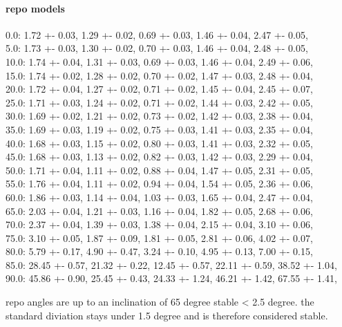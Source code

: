 \paragraph{repo models}
% 
0.0:     1.72 +- 0.03, 1.29 +- 0.02, 0.69 +- 0.03, 1.46 +- 0.04, 2.47 +- 0.05,\\
5.0:     1.73 +- 0.03, 1.30 +- 0.02, 0.70 +- 0.03, 1.46 +- 0.04, 2.48 +- 0.05,\\
10.0:    1.74 +- 0.04, 1.31 +- 0.03, 0.69 +- 0.03, 1.46 +- 0.04, 2.49 +- 0.06,\\
15.0:    1.74 +- 0.02, 1.28 +- 0.02, 0.70 +- 0.02, 1.47 +- 0.03, 2.48 +- 0.04,\\
20.0:    1.72 +- 0.04, 1.27 +- 0.02, 0.71 +- 0.02, 1.45 +- 0.04, 2.45 +- 0.07,\\
25.0:    1.71 +- 0.03, 1.24 +- 0.02, 0.71 +- 0.02, 1.44 +- 0.03, 2.42 +- 0.05,\\
30.0:    1.69 +- 0.02, 1.21 +- 0.02, 0.73 +- 0.02, 1.42 +- 0.03, 2.38 +- 0.04,\\
35.0:    1.69 +- 0.03, 1.19 +- 0.02, 0.75 +- 0.03, 1.41 +- 0.03, 2.35 +- 0.04,\\
40.0:    1.68 +- 0.03, 1.15 +- 0.02, 0.80 +- 0.03, 1.41 +- 0.03, 2.32 +- 0.05,\\
45.0:    1.68 +- 0.03, 1.13 +- 0.02, 0.82 +- 0.03, 1.42 +- 0.03, 2.29 +- 0.04,\\
50.0:    1.71 +- 0.04, 1.11 +- 0.02, 0.88 +- 0.04, 1.47 +- 0.05, 2.31 +- 0.05,\\
55.0:    1.76 +- 0.04, 1.11 +- 0.02, 0.94 +- 0.04, 1.54 +- 0.05, 2.36 +- 0.06,\\
60.0:    1.86 +- 0.03, 1.14 +- 0.04, 1.03 +- 0.03, 1.65 +- 0.04, 2.47 +- 0.04,\\
65.0:    2.03 +- 0.04, 1.21 +- 0.03, 1.16 +- 0.04, 1.82 +- 0.05, 2.68 +- 0.06,\\
70.0:    2.37 +- 0.04, 1.39 +- 0.03, 1.38 +- 0.04, 2.15 +- 0.04, 3.10 +- 0.06,\\
75.0:    3.10 +- 0.05, 1.87 +- 0.09, 1.81 +- 0.05, 2.81 +- 0.06, 4.02 +- 0.07,\\
80.0:    5.79 +- 0.17, 4.90 +- 0.47, 3.24 +- 0.10, 4.95 +- 0.13, 7.00 +- 0.15,\\
85.0:    28.45 +- 0.57, 21.32 +- 0.22, 12.45 +- 0.57, 22.11 +- 0.59, 38.52 +- 1.04,\\
90.0:    45.86 +- 0.90, 25.45 +- 0.43, 24.33 +- 1.24, 46.21 +- 1.42, 67.55 +- 1.41,\\
\par
% 
repo angles are up to an inclination of 65 degree stable < 2.5 degree.
the standard diviation stays under 1.5 degree and is therefore considered stable.
% 
